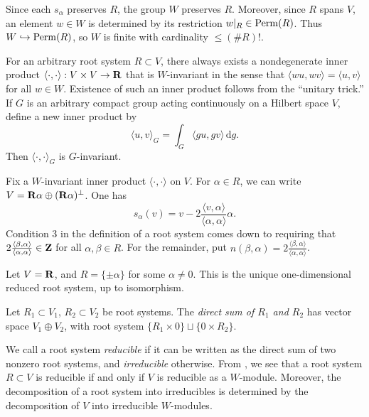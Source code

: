 Since each $s_\alpha$ preserves $R$, the group $W$ preserves $R$. Moreover, 
since $R$ spans $V$, an element $w\in W$ is determined by its restriction 
$w|_R\in \operatorname{Perm}(R)$. Thus $W\hookrightarrow \operatorname{Perm}(R)$, so $W$ is finite 
with cardinality $\leqslant (\# R)!$. 

For an arbitrary root system $R\subset V$, there always exists a nondegenerate 
inner product $\langle\cdot,\cdot\rangle:V\times V\to \mathbf{R}$ that is 
$W$-invariant in the sense that $\langle w u,w v\rangle = \langle u,v\rangle$ 
for all $w\in W$. Existence of such an inner product follows from the 
``unitary trick.'' If $G$ is an arbitrary compact group acting continuously 
on a Hilbert space $V$, define a new inner product by 
\[
  \langle u,v\rangle_G = \int_G \langle g u,g v\rangle\, \mathrm{d} g .
\]
Then $\langle\cdot,\cdot\rangle_G$ is $G$-invariant. 

Fix a $W$-invariant inner product $\langle\cdot,\cdot\rangle$ on $V$. For 
$\alpha\in R$, we can write $V=\mathbf{R}\alpha\oplus (\mathbf{R}\alpha)^\bot$. One has 
\[
  s_\alpha(v) = v-2\frac{\langle v,\alpha\rangle}{\langle \alpha,\alpha\rangle} \alpha .
\]
Condition 3 in the definition of a root system comes down to requiring that 
$2\frac{\langle \beta,\alpha\rangle}{\langle \alpha,\alpha\rangle}\in \mathbf{Z}$ for 
all $\alpha,\beta\in R$. For the remainder, put 
$n(\beta,\alpha) = 2\frac{\langle \beta,\alpha\rangle}{\langle \alpha,\alpha\rangle}$. 

\begin{example}
Let $V=\mathbf{R}$, and $R=\{\pm \alpha\}$ for some $\alpha\ne 0$. This is the unique 
one-dimensional reduced root system, up to isomorphism. 
\end{example}

\begin{definition}
Let $R_1\subset V_1$, $R_2\subset V_2$ be root systems. The \emph{direct sum 
of $R_1$ and $R_2$} has vector space $V_1\oplus V_2$, with root system 
$\{R_1\times 0\}\sqcup \{0\times R_2\}$. 
\end{definition}

We call a root system \emph{reducible} if it can be written as the direct sum 
of two nonzero root systems, and \emph{irreducible} otherwise. From 
\cite[VI \S 1.2 prop.5]{bourbaki-lie-alg-4-6}, we see that a root system 
$R\subset V$ is reducible if and only if $V$ is reducible as a $W$-module. 
Moreover, the decomposition of a root system into irreducibles is determined by 
the decomposition of $V$ into irreducible $W$-modules. 

